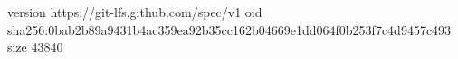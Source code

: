 version https://git-lfs.github.com/spec/v1
oid sha256:0bab2b89a9431b4ac359ea92b35cc162b04669e1dd064f0b253f7c4d9457c493
size 43840
